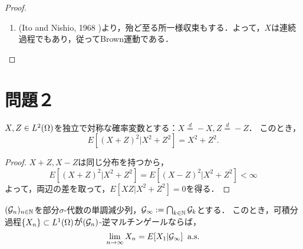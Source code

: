 \documentclass[uplatex,dvipdfmx]{jsarticle}
\begin{document}
\begin{proof}
\begin{enumerate}
        \item (Ito and Nishio, 1968 \cite{Ito-Nishio})より，殆ど至る所一様収束もする．よって，$X$は連続過程でもあり，従ってBrown運動である．
    \end{enumerate}
\end{proof}

\section*{問題２}

\begin{lemma*}
    $X,Z\in L^2(\Omega)$を独立で対称な確率変数とする：$X\overset{d}{=}-X,Z\overset{d}{=}-Z$．
    このとき，
    \[E[(X+Z)^2|X^2+Z^2]=X^2+Z^2.\]
\end{lemma*}
\begin{proof}
    $X+Z,X-Z$は同じ分布を持つから，
    \[E[(X+Z)^2|X^2+Z^2]=E[(X-Z)^2|X^2+Z^2]<\infty\]
    よって，両辺の差を取って，$E[XZ|X^2+Z^2]=0$を得る．
\end{proof}

\begin{theorem*}
    $(\mathcal{G}_n)_{n\in\mathbb{N}}$を部分$\sigma$-代数の単調減少列，$\mathcal{G}_\infty:=\bigcap_{k\in\mathbb{N}}\mathcal{G}_k$とする．
    このとき，可積分過程$\{X_n\}\subset L^1(\Omega)$が$(\mathcal{G}_n)$-逆マルチンゲールならば，
    \[\lim_{n\to\infty}X_n=E[X_1|\mathcal{G}_\infty]\;\;\mathrm{a.s.}\]
\end{theorem*}
\end{document}
